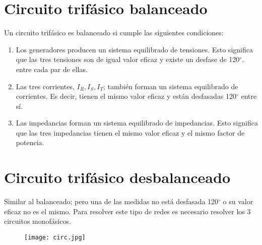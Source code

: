 \documentclass[a4paper,12pt]{report}
\begin{document}
\section{Circuito trifásico balanceado}
Un circuito trifásico es balanceado si cumple las siguientes condiciones:
\begin{enumerate}
\item Los generadores producen un sistema equilibrado de tensiones. Esto significa que las tres tensiones son de igual valor eficaz y existe un desfase de 120$^{\circ}$. entre cada par de ellas.
\item Las tres corrientes, $I_{R}, I_{S}, I_{T}$; también forman un sistema equilibrado de corrientes. Es decir, tienen el mismo valor eficaz y están desfasadas 120$^{\circ}$ entre sí.
\item Las impedancias forman un sistema equilibrado de impedancias. Esto significa que las tres impedancias tienen el mismo valor eficaz y el mismo factor de potencia.
\end{enumerate}
\section{Circuito trifásico desbalanceado}
Similar al balanceado; pero una de las medidas no está desfasada 120$^{\circ}$ o su valor eficaz no es el mismo. Para resolver este tipo de redes es necesario resolver los 3 circuitos monofásicos.
\begin{figure}[H]
\centering
\texttt{[image: circ.jpg]}
\end{figure}
\end{document}
